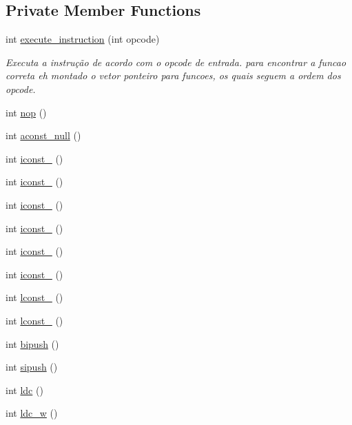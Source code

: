 \subsection*{Private Member Functions}
\begin{DoxyCompactItemize}
\item 
int \hyperlink{classInterpretador_a2bec82447756b2f6a43e68164ddbdde1}{execute\+\_\+instruction} (int opcode)
\begin{DoxyCompactList}\small\item\em Executa a instrução de acordo com o opcode de entrada. para encontrar a funcao correta eh montado o vetor ponteiro para funcoes, os quais seguem a ordem dos opcode. \end{DoxyCompactList}\item 
int \hyperlink{classInterpretador_a745dc9db0dcfa3b29c7e2ffb913334e5}{nop} ()
\item 
int \hyperlink{classInterpretador_a267f0b0ee8bb8beb9652625edc59c44c}{aconst\+\_\+null} ()
\item 
int \hyperlink{classInterpretador_acfcf3696d6024de47ebb094fed5c2b9d}{iconst\+\_} ()
\item 
int \hyperlink{classInterpretador_a0fe3c7f8e24c6afbee4f43faf7a7e71d}{iconst\+\_} ()
\item 
int \hyperlink{classInterpretador_a1124b3ad68f47e7a3096684592f9f6f4}{iconst\+\_} ()
\item 
int \hyperlink{classInterpretador_a7bedf620cfe1e02d37f71bb836544c20}{iconst\+\_} ()
\item 
int \hyperlink{classInterpretador_a9e5b62bc83d901b010a1ecda87b59229}{iconst\+\_} ()
\item 
int \hyperlink{classInterpretador_a3bacd8de29bb545763401494853710ff}{iconst\+\_} ()
\item 
int \hyperlink{classInterpretador_a6044c1c66315a0e5a0ad787ea964f455}{lconst\+\_} ()
\item 
int \hyperlink{classInterpretador_a58acc549590fb43f3cf8b5e31a3820eb}{lconst\+\_} ()
\item 
int \hyperlink{classInterpretador_a94c6a249b4be32b6d0803c4862187089}{bipush} ()
\item 
int \hyperlink{classInterpretador_ab8539347450d65f7228b87b9c996616a}{sipush} ()
\item 
int \hyperlink{classInterpretador_aa479032facfc9ce1c9d7822e6c967e22}{ldc} ()
\item 
int \hyperlink{classInterpretador_a061d91e2bf5d737331d2184116c344d7}{ldc\+\_\+w} ()

\end{DoxyCompactItemize}
